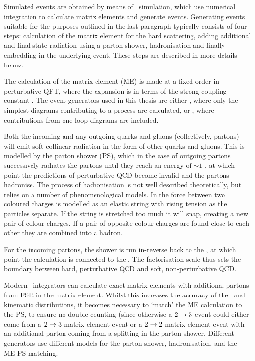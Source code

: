 Simulated events are obtained by
means of \mc\ simulation, which use numerical integration to calculate matrix
elements and generate events. Generating events suitable for the purposes
outlined in the last paragraph typically consists of four steps:
calculation of the matrix element for the hard scattering, adding additional and
final state radiation using a parton shower,
hadronisation and finally embedding in the underlying event. These steps are described
in more details below. 

The calculation of the matrix element (ME) is
made at a fixed order in perturbative QFT, where the expansion is in terms of
the strong coupling constant \alphaS. The event generators used in this thesis
are either , where only the simplest diagrams
contributing to a process are calculated, or ,
where contributions from one loop diagrams are included. 

Both the incoming and any outgoing quarks and gluons
(collectively, partons) will emit soft collinear radiation in the form of other quarks and gluons. This is
modelled by the parton shower (PS), which in the case of outgoing partons
successively radiates the partons until they reach an energy of $\sim 1$ \gev, at
which point the predictions of perturbative QCD become invalid and the partons
hadronise. The process of hadronisation is not well described theoretically,
but relies on a number of phenomenological models. In  the
force between two coloured charges is modelled as an elastic string with
rising tension as the particles separate. If the string is stretched too much
it will snap, creating a new pair of colour charges. If a pair of opposite
colour charges are found close to each other they are combined into a hadron.

For the incoming partons, the
shower is run in-reverse back to the , at which
point the calculation is connected to the \partDF. The
factorisation scale thus sets the boundary between hard, perturbative QCD and
soft, non-perturbative QCD.  

Modern \mc\ integrators can calculate exact matrix elements with additional
partons from FSR in the matrix element. Whilst this increases the accuracy of
the \cx\ and kinematic distributions, it becomes necessary to `match' the
ME calculation to the PS, to ensure no double counting (since otherwise a
$2\rightarrow3$ event could either come from a $2\rightarrow3$ matrix-element event or a $2\rightarrow2$
matrix element event with an additional parton coming from a splitting in the
parton shower. Different generators use different models for the parton
shower, hadronisation, and the ME-PS matching.

